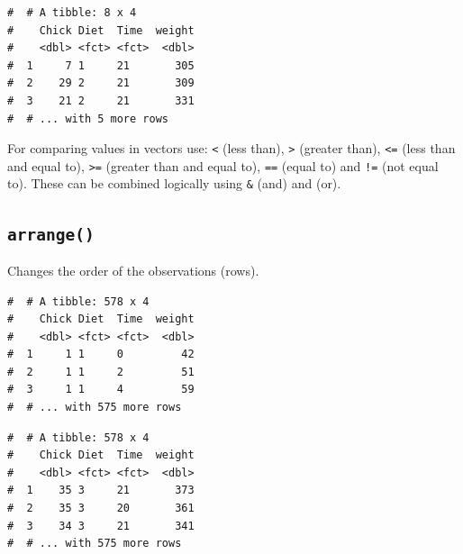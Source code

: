 \documentclass[a4paper,9pt,twocolumn,twoside,printwatermark=false]{pinp}
\begin{document}
\begin{ShadedResult}
\begin{verbatim}
#  # A tibble: 8 x 4
#    Chick Diet  Time  weight
#    <dbl> <fct> <fct>  <dbl>
#  1     7 1     21       305
#  2    29 2     21       309
#  3    21 2     21       331
#  # ... with 5 more rows
\end{verbatim}
\end{ShadedResult}

For comparing values in vectors use: \texttt{\textless{}} (less than),
\texttt{\textgreater{}} (greater than), \texttt{\textless{}=} (less than
and equal to), \texttt{\textgreater{}=} (greater than and equal to),
\texttt{==} (equal to) and \texttt{!=} (not equal to). These can be
combined logically using \texttt{\&} (and) and \texttt{\textbar{}} (or).

\subsection{\texorpdfstring{\texttt{arrange()}}{arrange()}}\label{arrange}

Changes the order of the observations (rows).

\begin{Shaded}
\begin{Highlighting}[]
\end{Highlighting}
\end{Shaded}

\begin{ShadedResult}
\begin{verbatim}
#  # A tibble: 578 x 4
#    Chick Diet  Time  weight
#    <dbl> <fct> <fct>  <dbl>
#  1     1 1     0         42
#  2     1 1     2         51
#  3     1 1     4         59
#  # ... with 575 more rows
\end{verbatim}
\end{ShadedResult}

\begin{Shaded}
\begin{Highlighting}[]
\end{Highlighting}
\end{Shaded}

\begin{ShadedResult}
\begin{verbatim}
#  # A tibble: 578 x 4
#    Chick Diet  Time  weight
#    <dbl> <fct> <fct>  <dbl>
#  1    35 3     21       373
#  2    35 3     20       361
#  3    34 3     21       341
#  # ... with 575 more rows
\end{verbatim}
\end{ShadedResult}
\end{document}
